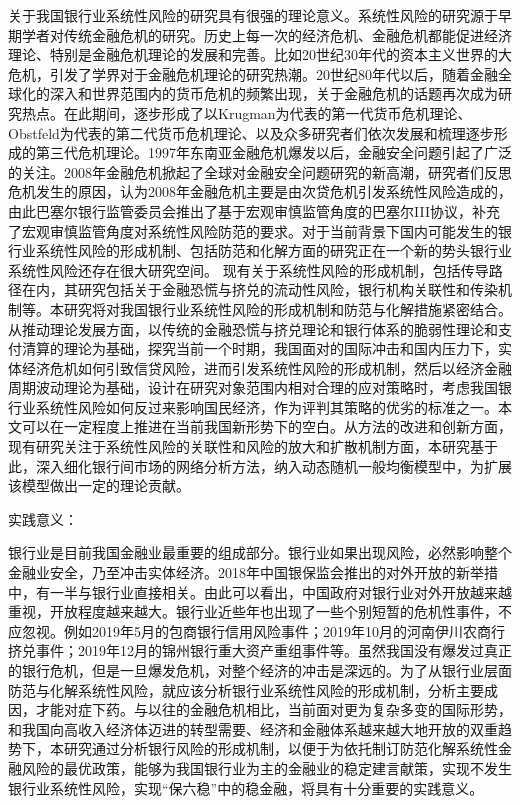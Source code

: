 关于我国银行业系统性风险的研究具有很强的理论意义。系统性风险的研究源于早期学者对传统金融危机的研究。历史上每一次的经济危机、金融危机都能促进经济理论、特别是金融危机理论的发展和完善。比如20世纪30年代的资本主义世界的大危机，引发了学界对于金融危机理论的研究热潮。20世纪80年代以后，随着金融全球化的深入和世界范围内的货币危机的频繁出现，关于金融危机的话题再次成为研究热点。在此期间，逐步形成了以Krugman为代表的第一代货币危机理论、Obstfeld为代表的第二代货币危机理论、以及众多研究者们依次发展和梳理逐步形成的第三代危机理论。1997年东南亚金融危机爆发以后，金融安全问题引起了广泛的关注。2008年金融危机掀起了全球对金融安全问题研究的新高潮，研究者们反思危机发生的原因，认为2008年金融危机主要是由次贷危机引发系统性风险造成的，由此巴塞尔银行监管委员会推出了基于宏观审慎监管角度的巴塞尔III协议，补充了宏观审慎监管角度对系统性风险防范的要求。对于当前背景下国内可能发生的银行业系统性风险的形成机制、包括防范和化解方面的研究正在一个新的势头银行业系统性风险还存在很大研究空间。
现有关于系统性风险的形成机制，包括传导路径在内，其研究包括关于金融恐慌与挤兑的流动性风险，银行机构关联性和传染机制等。本研究将对我国银行业系统性风险的形成机制和防范与化解措施紧密结合。从推动理论发展方面，以传统的金融恐慌与挤兑理论和银行体系的脆弱性理论和支付清算的理论为基础，探究当前一个时期，我国面对的国际冲击和国内压力下，实体经济危机如何引致信贷风险，进而引发系统性风险的形成机制，然后以经济金融周期波动理论为基础，设计在研究对象范围内相对合理的应对策略时，考虑我国银行业系统性风险如何反过来影响国民经济，作为评判其策略的优劣的标准之一。本文可以在一定程度上推进在当前我国新形势下的空白。从方法的改进和创新方面，现有研究关注于系统性风险的关联性和风险的放大和扩散机制方面，本研究基于此，深入细化银行间市场的网络分析方法，纳入动态随机一般均衡模型中，为扩展该模型做出一定的理论贡献。

实践意义：

银行业是目前我国金融业最重要的组成部分。银行业如果出现风险，必然影响整个金融业安全，乃至冲击实体经济。2018年中国银保监会推出的对外开放的新举措中，有一半与银行业直接相关。由此可以看出，中国政府对银行业对外开放越来越重视，开放程度越来越大。银行业近些年也出现了一些个别短暂的危机性事件，不应忽视。例如2019年5月的包商银行信用风险事件；2019年10月的河南伊川农商行挤兑事件；2019年12月的锦州银行重大资产重组事件等。虽然我国没有爆发过真正的银行危机，但是一旦爆发危机，对整个经济的冲击是深远的。为了从银行业层面防范与化解系统性风险，就应该分析银行业系统性风险的形成机制，分析主要成因，才能对症下药。与以往的金融危机相比，当前面对更为复杂多变的国际形势，和我国向高收入经济体迈进的转型需要、经济和金融体系越来越大地开放的双重趋势下，本研究通过分析银行风险的形成机制，以便于为依托制订防范化解系统性金融风险的最优政策，能够为我国银行业为主的金融业的稳定建言献策，实现不发生银行业系统性风险，实现“保六稳”中的稳金融，将具有十分重要的实践意义。


